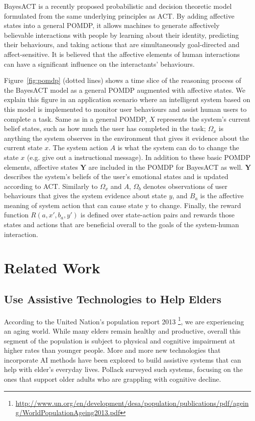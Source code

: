 BayesACT \cite{hoey2013bayesian} is a recently proposed probabilistic and decision theoretic model formulated from the same underlying principles as ACT. By adding affective states into a general POMDP, it allows machines to generate affectively believable interactions with people by learning about their identity, predicting their behaviours, and taking actions that are simultaneously goal-directed and affect-sensitive. It is believed that the affective elements of human interactions can have a significant influence on the interactants' behaviours.

Figure~\ref{fig:pomdp} (dotted lines) shows a time slice of the reasoning process of the BayesACT model as a general POMDP augmented with affective states. We explain this figure in an application scenario where an intelligent system based on this model is implemented to monitor user behaviours and assist human users to complete a task. Same as in a general POMDP, $X$ represents the system's current belief states, such as how much the user has completed in the task; $\Omega_{x}$ is anything the system observes in the environment that gives it evidence about the current state $x$. The system action $A$ is what the system can do to change the state $x$ (e.g. give out a instructional message). In addition to these basic POMDP elements, affective states $\mathbf{Y}$ are included in the POMDP for BayesACT as well. $\mathbf{Y}$ describes the system's beliefs of the user's emotional states and is updated according to ACT. Similarly to $\Omega_{x}$ and $A$, $\Omega_{b}$ denotes observations of user behaviours that gives the system evidence about state $y$, and $B_{a}$ is the affective meaning of system action that can cause state y to change. Finally, the reward function $R(a, x', b_{a}, y')$ is defined over state-action pairs and rewards those states and actions that are beneficial overall to the goals of the system-human interaction.

\section{Related Work}
\subsection{Use Assistive Technologies to Help Elders}

According to the United Nation's population report 2013 \footnote{\url{http://www.un.org/en/development/desa/population/publications/pdf/ageing/WorldPopulationAgeing2013.pdf}}, we are experiencing an aging world. While many elders remain healthy and productive, overall this segment of the population is subject to physical and cognitive impairment at higher rates than younger people. More and more new technologies that incorporate AI methods have been explored to build assistive systems that can help with elder's everyday lives. Pollack \cite{pollack2005intelligent} surveyed such systems, focusing on the ones that support older adults who are grappling with cognitive decline.

